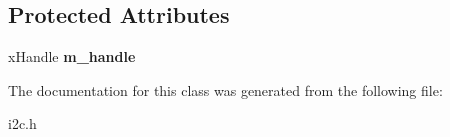 \subsection*{Protected Attributes}
\begin{DoxyCompactItemize}
\item 
\hypertarget{class_c_i2_c_aef073fe282d448add47eb63b3f481205}{x\-Handle {\bfseries m\-\_\-handle}}\label{class_c_i2_c_aef073fe282d448add47eb63b3f481205}

\end{DoxyCompactItemize}


The documentation for this class was generated from the following file\-:\begin{DoxyCompactItemize}
\item 
i2c.\-h\end{DoxyCompactItemize}
